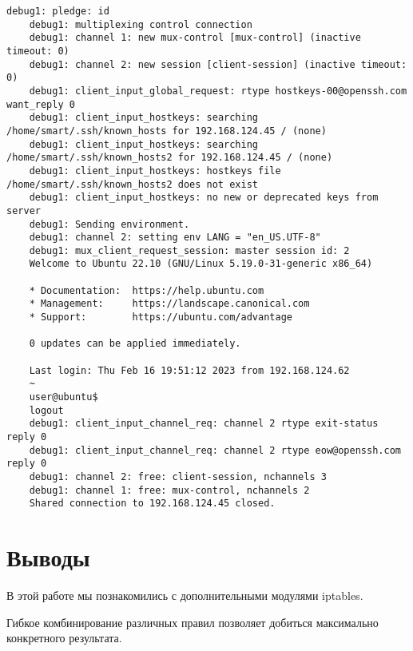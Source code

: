 \begin{Verbatim}[frame=single]
    debug1: pledge: id
    debug1: multiplexing control connection
    debug1: channel 1: new mux-control [mux-control] (inactive timeout: 0)
    debug1: channel 2: new session [client-session] (inactive timeout: 0)
    debug1: client_input_global_request: rtype hostkeys-00@openssh.com want_reply 0
    debug1: client_input_hostkeys: searching /home/smart/.ssh/known_hosts for 192.168.124.45 / (none)
    debug1: client_input_hostkeys: searching /home/smart/.ssh/known_hosts2 for 192.168.124.45 / (none)
    debug1: client_input_hostkeys: hostkeys file /home/smart/.ssh/known_hosts2 does not exist
    debug1: client_input_hostkeys: no new or deprecated keys from server
    debug1: Sending environment.
    debug1: channel 2: setting env LANG = "en_US.UTF-8"
    debug1: mux_client_request_session: master session id: 2
    Welcome to Ubuntu 22.10 (GNU/Linux 5.19.0-31-generic x86_64)

    * Documentation:  https://help.ubuntu.com
    * Management:     https://landscape.canonical.com
    * Support:        https://ubuntu.com/advantage

    0 updates can be applied immediately.

    Last login: Thu Feb 16 19:51:12 2023 from 192.168.124.62
    ~
    user@ubuntu$ 
    logout
    debug1: client_input_channel_req: channel 2 rtype exit-status reply 0
    debug1: client_input_channel_req: channel 2 rtype eow@openssh.com reply 0
    debug1: channel 2: free: client-session, nchannels 3
    debug1: channel 1: free: mux-control, nchannels 2
    Shared connection to 192.168.124.45 closed.
\end{Verbatim}

\section*{Выводы}

В этой работе мы познакомились с дополнительными модулями iptables.

Гибкое комбинирование различных правил позволяет добиться максимально конкретного результата.
